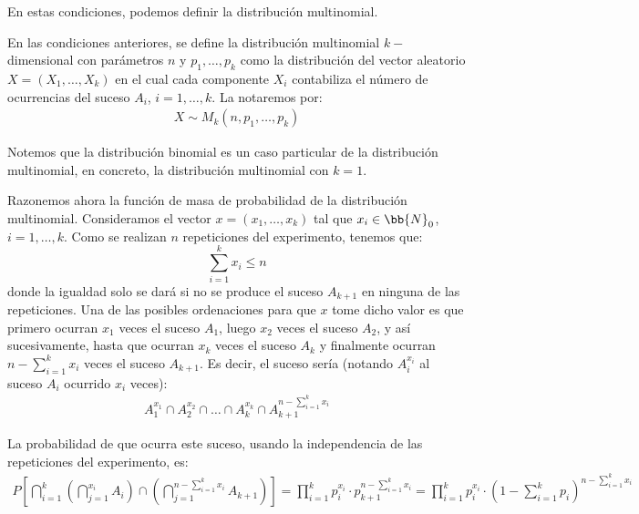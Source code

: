 En estas condiciones, podemos definir la distribución multinomial.
\begin{definicion}
    En las condiciones anteriores, se define la distribución multinomial $k-$dimensional con parámetros $n$ y $p_1, \ldots, p_k$ como la distribución del vector aleatorio $X=(X_1, \ldots, X_k)$ en el cual cada componente $X_i$ contabiliza el número de ocurrencias del suceso $A_i$, $i=1, \ldots, k$. La notaremos por:
    \begin{align*}
        X\sim M_k(n, p_1, \ldots, p_k)
    \end{align*}
\end{definicion}
\begin{observacion}
    Notemos que la distribución binomial es un caso particular de la distribución multinomial, en concreto, la distribución multinomial con $k=1$.
\end{observacion}

Razonemos ahora la función de masa de probabilidad de la distribución multinomial. Consideramos el vector $x=(x_1, \ldots, x_k)$ tal que $x_i\in \bb{N}_0$, $i=1, \ldots, k$. Como se realizan $n$ repeticiones del experimento, tenemos que:
\begin{equation*}
    \sum_{i=1}^k x_i\leq n
\end{equation*}
donde la igualdad solo se dará si no se produce el suceso $A_{k+1}$ en ninguna de las repeticiones.
Una de las posibles ordenaciones para que $x$ tome dicho valor es que primero ocurran $x_1$ veces el suceso $A_1$, luego $x_2$ veces el suceso $A_2$, y así sucesivamente, hasta que ocurran $x_k$ veces el suceso $A_k$ y finalmente ocurran $n-\sum_{i=1}^k x_i$ veces el suceso $A_{k+1}$. Es decir, el suceso sería (notando $A_i^{x_i}$ al suceso $A_i$ ocurrido $x_i$ veces):
\begin{align*}
    A_1^{x_1}\cap A_2^{x_2}\cap \ldots \cap A_k^{x_k}\cap A_{k+1}^{n-\sum\limits_{i=1}^k x_i}
\end{align*}

La probabilidad de que ocurra este suceso, usando la independencia de las repeticiones del experimento, es:
\begin{align*}
    P\left[\bigcap_{i=1}^{k}\left(\bigcap_{j=1}^{x_i}A_i\right)\cap \left(\bigcap_{j=1}^{n-\sum\limits_{i=1}^k x_i}A_{k+1}\right)\right]=\prod_{i=1}^k p_i^{x_i}\cdot p_{k+1}^{n-\sum\limits_{i=1}^k x_i}=\prod_{i=1}^{k} p_i^{x_i} \cdot \left(1-\sum_{i=1}^k p_i\right)^{n-\sum\limits_{i=1}^k x_i}
\end{align*}


